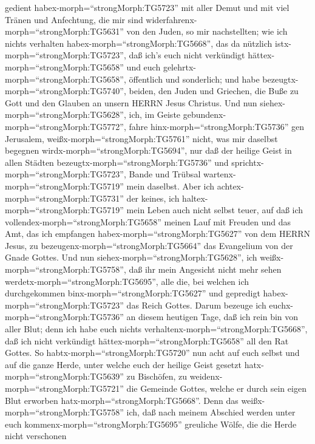 gedient habex-morph=``strongMorph:TG5723'' mit aller Demut und mit viel
Tränen und Anfechtung, die mir sind
widerfahrenx-morph=``strongMorph:TG5631'' von den Juden, so mir
nachstellten;  wie ich nichts verhalten
habex-morph=``strongMorph:TG5668'', das da nützlich
istx-morph=``strongMorph:TG5723'', daß ich's euch nicht verkündigt
hättex-morph=``strongMorph:TG5658'' und euch
gelehrtx-morph=``strongMorph:TG5658'', öffentlich und sonderlich;
 und habe bezeugtx-morph=``strongMorph:TG5740'', beiden,
den Juden und Griechen, die Buße zu Gott und den Glauben an unsern HERRN
Jesus Christus.  Und nun
siehex-morph=``strongMorph:TG5628'', ich, im Geiste
gebundenx-morph=``strongMorph:TG5772'', fahre
hinx-morph=``strongMorph:TG5736'' gen Jerusalem,
weißx-morph=``strongMorph:TG5761'' nicht, was mir daselbst begegnen
wirdx-morph=``strongMorph:TG5694'',  nur daß der heilige
Geist in allen Städten bezeugtx-morph=``strongMorph:TG5736'' und
sprichtx-morph=``strongMorph:TG5723'', Bande und Trübsal
wartenx-morph=``strongMorph:TG5719'' mein daselbst.  Aber
ich achtex-morph=``strongMorph:TG5731'' der keines, ich
haltex-morph=``strongMorph:TG5719'' mein Leben auch nicht selbst teuer,
auf daß ich vollendex-morph=``strongMorph:TG5658'' meinen Lauf mit
Freuden und das Amt, das ich empfangen
habex-morph=``strongMorph:TG5627'' von dem HERRN Jesus, zu
bezeugenx-morph=``strongMorph:TG5664'' das Evangelium von der Gnade
Gottes.  Und nun siehex-morph=``strongMorph:TG5628'', ich
weißx-morph=``strongMorph:TG5758'', daß ihr mein Angesicht nicht mehr
sehen werdetx-morph=``strongMorph:TG5695'', alle die, bei welchen ich
durchgekommen binx-morph=``strongMorph:TG5627'' und gepredigt
habex-morph=``strongMorph:TG5723'' das Reich Gottes.  Darum
bezeuge ich euchx-morph=``strongMorph:TG5736'' an diesem heutigen Tage,
daß ich rein bin von aller Blut;  denn ich habe euch nichts
verhaltenx-morph=``strongMorph:TG5668'', daß ich nicht verkündigt
hättex-morph=``strongMorph:TG5658'' all den Rat Gottes.  So
habtx-morph=``strongMorph:TG5720'' nun acht auf euch selbst und auf die
ganze Herde, unter welche euch der heilige Geist gesetzt
hatx-morph=``strongMorph:TG5639'' zu Bischöfen, zu
weidenx-morph=``strongMorph:TG5721'' die Gemeinde Gottes, welche er
durch sein eigen Blut erworben hatx-morph=``strongMorph:TG5668''.
 Denn das weißx-morph=``strongMorph:TG5758'' ich, daß nach
meinem Abschied werden unter euch kommenx-morph=``strongMorph:TG5695''
greuliche Wölfe, die die Herde nicht verschonen
